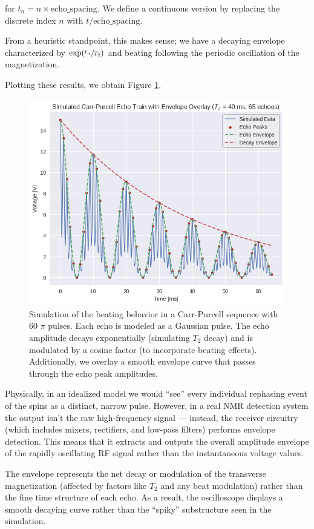 \documentclass[%
 reprint,
 amsmath,amssymb,
 aps,
]{revtex4-2}
\begin{document}
for $t_n = n \times \text{echo\_spacing}$. We define a continuous version by replacing the discrete index $n$ with $t/\text{echo\_spacing}$.

From a heuristic standpoint, this makes sense; we have a decaying envelope characterized by $\exp(\sfrac{t_n}{T_2})$ and beating following the periodic oscillation of the magnetization. 

Plotting these results, we obtain Figure \ref{fig:simulation}. 

\begin{figure}[h]
    \centering
    \includegraphics[width = 0.8\linewidth]{figs/purcell/simulation.png}
   \caption{Simulation of the beating behavior in a Carr-Purcell sequence with 60 $\pi$ pulses. Each echo is modeled as a Gaussian pulse. The echo amplitude decays exponentially (simulating $T_2$ decay) and is modulated by a cosine factor (to incorporate beating effects). Additionally, we overlay a smooth envelope curve that passes through the echo peak amplitudes.}\label{fig:simulation}
\end{figure}

Physically, in an idealized model we would ``see'' every individual rephasing event of the spins as a distinct, narrow pulse. However, in a real NMR detection system the output isn't the raw high-frequency signal — instead, the receiver circuitry (which includes mixers, rectifiers, and low-pass filters) performs envelope detection. This means that it extracts and outputs the overall amplitude envelope of the rapidly oscillating RF signal rather than the instantaneous voltage values.

The envelope represents the net decay or modulation of the transverse magnetization (affected by factors like $T_2$ and any beat modulation) rather than the fine time structure of each echo. As a result, the oscilloscope displays a smooth decaying curve rather than the ``spiky'' substructure seen in the simulation.
\end{document}
